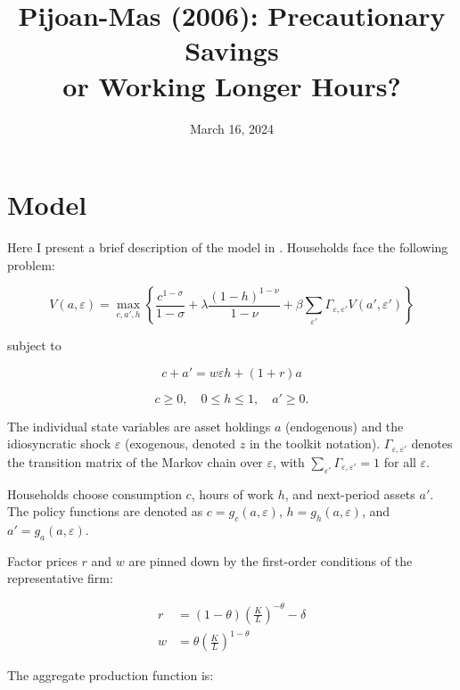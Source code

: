 \documentclass[12pt]{article}
\title{Pijoan-Mas (2006): Precautionary Savings\\or Working Longer Hours?}
\date{March 16, 2024}
\begin{document}
	
	\maketitle
	
	\section*{Model}
	
	Here I present a brief description of the model in \cite{pijoan2006}. Households face the following problem:
	
	\begin{equation*}
		V(a, \varepsilon) = \max_{c, a', h} \left\{ \frac{c^{1 - \sigma}}{1 - \sigma} + \lambda \frac{(1 - h)^{1 - \nu}}{1 - \nu} + \beta \sum_{\varepsilon'} \Gamma_{\varepsilon, \varepsilon'} V(a', \varepsilon') \right\}
	\end{equation*}
	
	subject to
	
	\begin{equation*}
		c + a' = w \varepsilon h + (1 + r)a
	\end{equation*}
	
	\begin{equation*}
		c \geq 0, \quad 0 \leq h \leq 1, \quad a' \geq 0.
	\end{equation*}
	
	The individual state variables are asset holdings $a$ (endogenous) and the idiosyncratic shock $\varepsilon$ (exogenous, denoted $z$ in the toolkit notation). $\Gamma_{\varepsilon, \varepsilon'}$ denotes the transition matrix of the Markov chain over $\varepsilon$, with $\sum_{\varepsilon'} \Gamma_{\varepsilon, \varepsilon'} = 1$ for all $\varepsilon$.
	
	Households choose consumption $c$, hours of work $h$, and next-period assets $a'$. The policy functions are denoted as $c = g_c(a, \varepsilon)$, $h = g_h(a, \varepsilon)$, and $a' = g_a(a, \varepsilon)$.
	
	Factor prices $r$ and $w$ are pinned down by the first-order conditions of the representative firm:
	
	\begin{align*}
		r &= (1 - \theta) \left(\frac{K}{L}\right)^{-\theta} - \delta \\
		w &= \theta \left(\frac{K}{L}\right)^{1 - \theta}
	\end{align*}
	
	The aggregate production function is:
	
\end{document}
